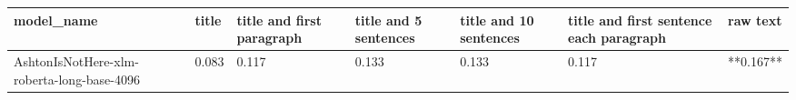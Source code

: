 \begin{tabular}{lllllll}
\toprule
                                model\_name & title & title and first paragraph & title and 5 sentences & title and 10 sentences & title and first sentence each paragraph &  raw text \\
\midrule
AshtonIsNotHere-xlm-roberta-long-base-4096 & 0.083 &                     0.117 &                 0.133 &                  0.133 &                                   0.117 & **0.167** \\
\bottomrule
\end{tabular}
